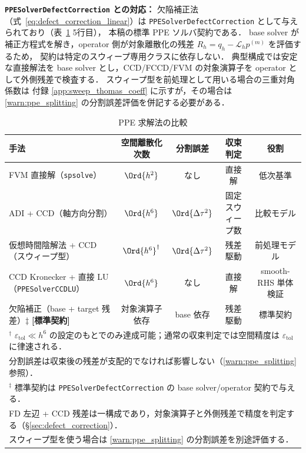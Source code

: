 \textbf{\texttt{PPESolverDefectCorrection} との対応：}
欠陥補正法（式~\eqref{eq:defect_correction_linear}）は
\texttt{PPESolverDefectCorrection} として与えられており（表~\ref{tab:ppe_methods} 5行目），
本稿の標準 PPE ソルバ契約である．
base solver が補正方程式を解き，operator 側が対象離散化の残差
$R_h = q_h-\mathcal{L}_h p^{(m)}$ を評価するため，
契約は特定のスウィープ専用クラスに依存しない．
典型構成では安定な直接解法を base solver とし，CCD/FCCD/FVM の対象演算子を
operator として外側残差で検査する．
スウィープ型を前処理として用いる場合の三重対角係数は
付録 \ref{app:sweep_thomas_coeff} に示すが，その場合は
\ref{warn:ppe_splitting} の分割誤差評価を併記する必要がある．

\begin{table}[htbp]
\centering
\caption{PPE 求解法の比較}
\label{tab:ppe_methods}
\PaperTableDenseSetup
\begin{tabular}{lcccc}
\hline
手法 & 空間離散化次数 & 分割誤差 & 収束判定 & 役割 \\
\hline
FVM 直接解（\texttt{spsolve}） & $\Ord{h^2}$ & なし & 直接解 & 低次基準 \\
ADI + CCD（軸方向分割） & $\Ord{h^6}$ & $\Ord{\Delta\tau^2}$ & 固定スウィープ数 & 比較モデル \\
仮想時間陰解法 + CCD（スウィープ型）& $\Ord{h^6}^{\dagger}$ & $\Ord{\Delta\tau^2}$ & 残差駆動 & 前処理モデル \\
CCD Kronecker + 直接 LU（\texttt{PPESolverCCDLU}） & $\Ord{h^6}$ & なし & 直接解 & smooth-RHS 単体検証 \\
欠陥補正（base + target 残差）$\ddagger$ \textbf{[標準契約]} & 対象演算子依存 & base 依存 & 残差駆動 & 標準契約 \\
\hline
\multicolumn{5}{l}{$^{\dagger}$ $\varepsilon_\mathrm{tol} \ll h^6$ の設定のもとでのみ達成可能；通常の収束判定では空間精度は $\varepsilon_\mathrm{tol}$ に律速される．}\\
\multicolumn{5}{l}{\phantom{$^{\dagger}$} 分割誤差は収束後の残差が支配的でなければ影響しない（\ref{warn:ppe_splitting} 参照）．}\\
\multicolumn{5}{l}{$^{\ddagger}$ 標準契約は \texttt{PPESolverDefectCorrection} の base solver/operator 契約で与える．}\\
\multicolumn{5}{l}{\phantom{$^{\ddagger}$} FD 左辺 + CCD 残差は一構成であり，対象演算子と外側残差で精度を判定する（§\ref{sec:defect_correction}）．}\\
\multicolumn{5}{l}{\phantom{$^{\ddagger}$} スウィープ型を使う場合は \ref{warn:ppe_splitting} の分割誤差を別途評価する．}
\end{tabular}
\end{table}

